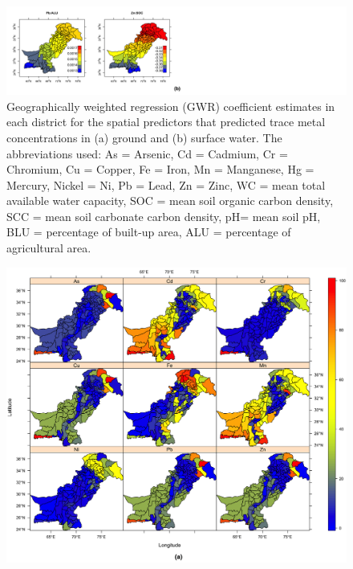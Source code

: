\begin{landscape}
\clearpage

\begin{figure}[h!]
  \centering
  \vspace{-2cm} \includegraphics[width=\linewidth]{Figures/Fig_D_1_b_2.png}
  \caption{Geographically weighted regression (GWR) coefficient estimates in each district for the spatial predictors that predicted trace metal concentrations in (a) ground and (b) surface water. The abbreviations used: As = Arsenic, Cd = Cadmium, Cr = Chromium, Cu = Copper, Fe = Iron, Mn = Manganese, Hg = Mercury, Nickel = Ni, Pb = Lead, Zn = Zinc, WC = mean total available water capacity, SOC = mean soil organic carbon density, SCC = mean soil carbonate carbon density, pH= mean soil pH, BLU = percentage of built-up area, ALU = percentage of agricultural area.}
  \label{Fig_D_1_b_2}
\end{figure}

\end{landscape}

\newpage

\begin{figure}[hp!]
  \centering
  \includegraphics[width=1.1\textwidth]{Figures/Fig_D_2_a.png}
  \label{Fig_D_2_a}
\end{figure}

